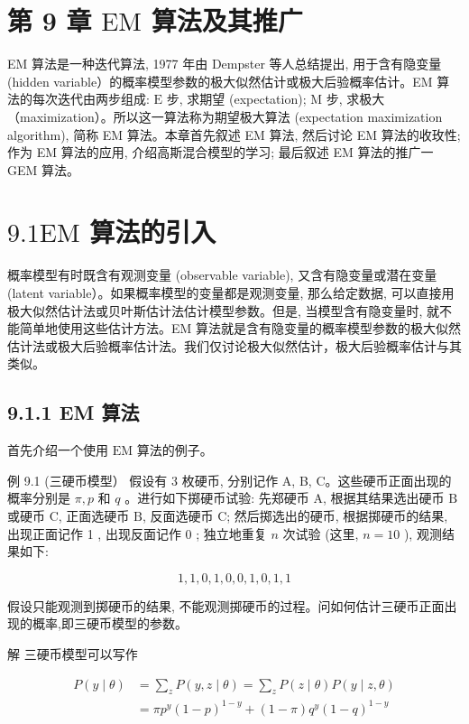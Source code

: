 \documentclass[10pt]{article}
\begin{document}
\section*{第 9 章 $\mathrm{EM}$ 算法及其推广}
EM 算法是一种迭代算法, 1977 年由 Dempster 等人总结提出, 用于含有隐变量 (hidden variable）的概率模型参数的极大似然估计或极大后验概率估计。EM 算法的每次迭代由两步组成: $\mathrm{E}$ 步, 求期望 (expectation); $\mathrm{M}$ 步, 求极大（maximization）。所以这一算法称为期望极大算法 (expectation maximization algorithm), 简称 EM 算法。本章首先叙述 EM 算法, 然后讨论 EM 算法的收玫性; 作为 EM 算法的应用, 介绍高斯混合模型的学习; 最后叙述 EM 算法的推广一GEM 算法。

\section*{$9.1 \mathrm{EM}$ 算法的引入}
概率模型有时既含有观测变量 (observable variable), 又含有隐变量或潜在变量 (latent variable）。如果概率模型的变量都是观测变量, 那么给定数据, 可以直接用极大似然估计法或贝叶斯估计法估计模型参数。但是, 当模型含有隐变量时, 就不能简单地使用这些估计方法。EM 算法就是含有隐变量的概率模型参数的极大似然估计法或极大后验概率估计法。我们仅讨论极大似然估计，极大后验概率估计与其类似。

\subsection*{9.1.1 EM 算法}
首先介绍一个使用 $\mathrm{EM}$ 算法的例子。

例 9.1 (三硬币模型） 假设有 3 枚硬币, 分别记作 A, B, C。这些硬币正面出现的概率分别是 $\pi, p$ 和 $q$ 。进行如下掷硬币试验: 先郑硬币 $\mathrm{A}$, 根据其结果选出硬币 $\mathrm{B}$ 或硬币 $\mathrm{C}$, 正面选硬币 $\mathrm{B}$, 反面选硬币 $\mathrm{C}$; 然后掷选出的硬币, 根据掷硬币的结果, 出现正面记作 1 , 出现反面记作 0 ; 独立地重复 $n$ 次试验 (这里, $n=10$ ), 观测结果如下:

$$
1,1,0,1,0,0,1,0,1,1
$$

假设只能观测到掷硬币的结果, 不能观测掷硬币的过程。问如何估计三硬币正面出现的概率,即三硬币模型的参数。

解 三硬币模型可以写作


\begin{align*}
P(y \mid \theta) & =\sum_{z} P(y, z \mid \theta)=\sum_{z} P(z \mid \theta) P(y \mid z, \theta) \\
& =\pi p^{y}(1-p)^{1-y}+(1-\pi) q^{y}(1-q)^{1-y} \tag{9.1}
\end{align*}
\end{document}
